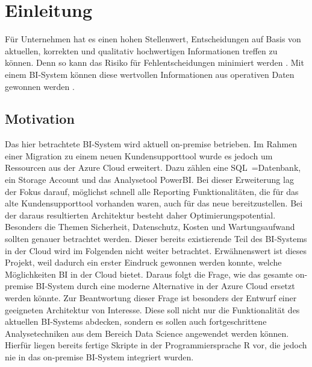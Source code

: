 \chapter{Einleitung}
\label{ch:intro}
Für Unternehmen hat es einen hohen Stellenwert, Entscheidungen auf Basis von aktuellen, korrekten und qualitativ hochwertigen Informationen treffen zu können. Denn so kann das Risiko für Fehlentscheidungen minimiert werden \cite{grunwald_business_2009}. Mit einem BI-System können diese wertvollen Informationen aus operativen Daten gewonnen werden \cite{muller_business_2013}.

\section{Motivation}
\label{sec:intro:motivation}
Das hier betrachtete BI-System wird aktuell on-premise betrieben. Im Rahmen einer Migration zu einem neuen Kundensupporttool wurde es jedoch um Ressourcen aus der Azure Cloud erweitert. Dazu zählen eine SQL~=Datenbank, ein Storage Account und das Analysetool PowerBI. Bei dieser Erweiterung lag der Fokus darauf, möglichst schnell alle Reporting Funktionalitäten, die für das alte Kundensupporttool vorhanden waren, auch für das neue bereitzustellen. Bei der daraus resultierten Architektur besteht daher Optimierungspotential. Besonders die Themen Sicherheit, Datenschutz, Kosten und Wartungsaufwand sollten genauer betrachtet werden. Dieser bereits existierende Teil des BI-Systems in der Cloud wird im Folgenden nicht weiter betrachtet. Erwähnenswert ist dieses Projekt, weil dadurch ein erster Eindruck gewonnen werden konnte, welche Möglichkeiten BI in der Cloud bietet. Daraus folgt die Frage, wie das gesamte on-premise BI-System durch eine moderne Alternative in der Azure Cloud ersetzt werden könnte. Zur Beantwortung dieser Frage ist besonders der Entwurf einer geeigneten Architektur von Interesse. Diese soll nicht nur die Funktionalität des aktuellen BI-Systems abdecken, sondern es sollen auch fortgeschrittene Analysetechniken aus dem Bereich Data Science angewendet werden können. Hierfür liegen bereits fertige Skripte in der Programmiersprache R vor, die jedoch nie in das on-premise BI-System integriert wurden.

